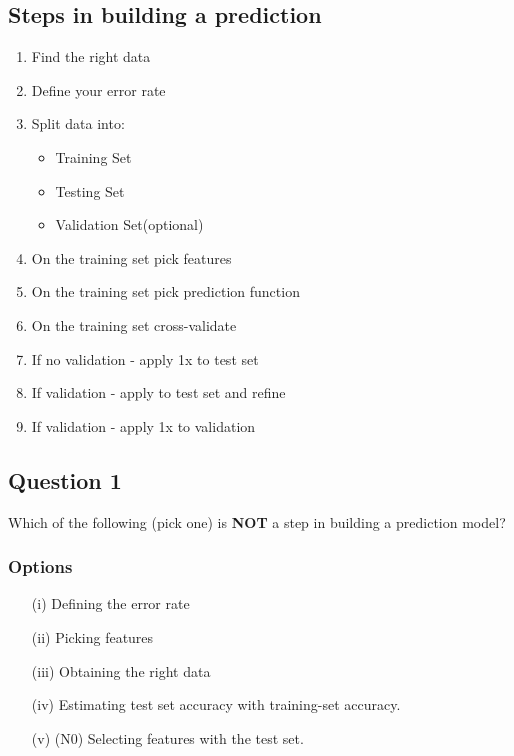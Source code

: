 \documentclass[caret-main.tex]{subfiles}
\begin{document}
\subsection*{Steps in building a prediction}
\begin{enumerate}
\item Find the right data
\item Define your error rate
\item Split data into:
\begin{itemize}
\item Training Set
\item Testing Set
\item Validation Set(optional)
\end{itemize}
\item On the training set pick features
\item On the training set pick prediction function
\item On the training set cross-validate

\item If no validation - apply 1x to test set
\item If validation - apply to test set and refine
\item If validation - apply 1x to validation
\end{enumerate}
\subsection*{Question 1}
Which of the following (pick one) is \textbf{NOT} a step in building a prediction model?
\subsubsection*{Options}
\begin{itemize}
\item[(i)] Defining the error rate			
\item[(ii)] Picking features			
\item[(iii)] Obtaining the right data			
\item[(iv)] Estimating test set accuracy with training-set accuracy. 
\item[(v)] (N0) Selecting features with the test set.
\end{itemize} 
\newpage
\end{document}
